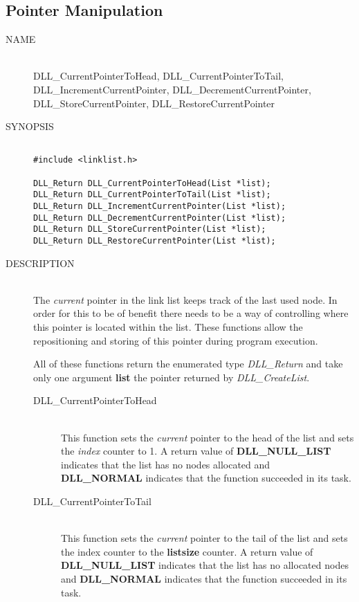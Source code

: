 \documentclass[10pt,letterpaper,titlepage]{article}
\begin{document}
\subsection{Pointer Manipulation}
\begin{description}
\item[NAME]\quad\\
DLL\_CurrentPointerToHead, DLL\_CurrentPointerToTail,\\
DLL\_IncrementCurrentPointer, DLL\_DecrementCurrentPointer,\\
DLL\_StoreCurrentPointer, DLL\_RestoreCurrentPointer

\item[SYNOPSIS]
\begin{verbatim}

#include <linklist.h>

DLL_Return DLL_CurrentPointerToHead(List *list);
DLL_Return DLL_CurrentPointerToTail(List *list);
DLL_Return DLL_IncrementCurrentPointer(List *list);
DLL_Return DLL_DecrementCurrentPointer(List *list);
DLL_Return DLL_StoreCurrentPointer(List *list);
DLL_Return DLL_RestoreCurrentPointer(List *list);
\end{verbatim}

\item[DESCRIPTION]\quad\\
The \emph{current} pointer in the link list keeps track of the last used node.  In order for this to be of benefit there needs to be a way of controlling where this pointer is located within the list.  These functions allow the repositioning and storing of this pointer during program execution.
\vspace{8pt}

\noindent
All of these functions return the enumerated type \emph{DLL\_Return} and take only one argument \textbf{list} the pointer returned by \emph{DLL\_CreateList}.

\begin{description}
\item[DLL\_CurrentPointerToHead]\quad\\
 This function sets the \emph{current} pointer to the head of the list and sets the \emph{index} counter to 1.  A return value of \textbf{DLL\_NULL\_LIST} indicates that the list has no nodes allocated and \textbf{DLL\_NORMAL} indicates that the function succeeded in its task.

\item[DLL\_CurrentPointerToTail]\quad\\
 This function sets the \emph{current} pointer to the tail of the list and sets the index counter to the \textbf{listsize} counter.  A return value of \textbf{DLL\_NULL\_LIST} indicates that the list has no allocated nodes and \textbf{DLL\_NORMAL} indicates that the function succeeded in its task.


\end{description}
\end{description}
\end{document}
